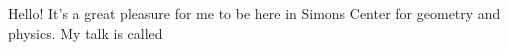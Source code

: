 \documentclass[a4paper]{article}
\begin{document}
Hello!
It's a great pleasure for me to be here in Simons Center for geometry and physics. 
My talk is called 
\end{document}
